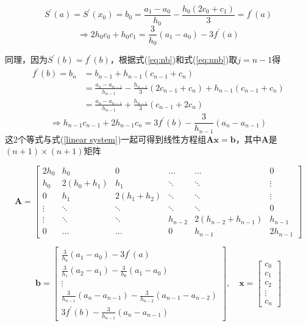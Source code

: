 \documentclass[12pt]{ctexart}
\begin{document}
	\begin{equation*}
	S^{'}(a)=S^{'}(x_0)=b_0=\frac{a_1-a_0}{h_0}-\frac{h_0(2c_0+c_1)}{3}=f^{'}(a)
	\end{equation*}
	\begin{equation*}
	\Rightarrow
	2h_0c_0+h_0c_1=\frac{3}{h_0}(a_1-a_0)-3f^{'}(a)
	\end{equation*}
	
	同理，因为$S^{'}(b)=f^{'}(b)$，根据式(\ref{eq:nb})和式(\ref{eq:nnb})取$j=n-1$得
	\begin{equation*}
	\begin{split}
	f^{'}(b)=b_n&=b_{n-1}+h_{n-1}(c_{n-1}+c_n) \\
	&=\frac{a_n-a_{n-1}}{h_{n-1}}-\frac{h_{n-1}}{3}(2c_{n-1}+c_n)+h_{n-1}(c_{n-1}+c_n) \\
	&=\frac{a_n-a_{n-1}}{h_{n-1}}+\frac{h_{n-1}}{3}(c_{n-1}+2c_n)
	\end{split}
	\end{equation*}
	\begin{equation*}
	\Rightarrow
	h_{n-1}c_{n-1}+2h_{n-1}c_n=3f^{'}(b)-\frac{3}{h_{n-1}}(a_n-a_{n-1})
	\end{equation*}
	这2个等式与式(\ref{linear system})一起可得到线性方程组$\mathbf{Ax}=\mathbf{b}$，其中$\mathbf{A}$是$(n+1)\times(n+1)$矩阵
	
	\[
	\mathbf{A}=\begin{bmatrix}
	2h_0&h_0&0&\dots&\dots&0 \\
	h_0&2(h_0+h_1)&h_1&\ddots&\ddots&\vdots \\
	0&h_1&2(h_1+h_2)&\ddots&\ddots&\vdots \\
	\vdots&\ddots&\ddots&\ddots&\ddots&0 \\
	\vdots&\ddots&\ddots&h_{n-2}&2(h_{n-2}+h_{n-1})&h_{n-1} \\
	0&\dots&\dots&0&h_{n-1}&2h_{n-1}
	\end{bmatrix}
	\]
	
	\[
	\mathbf{b}=\begin{bmatrix}
	\frac{3}{h_0}(a_1-a_0)-3f^{'}(a) \\
	\frac{3}{h_1}(a_2-a_1)-\frac{3}{h_0}(a_1-a_0) \\
	\vdots \\
	\frac{3}{h_{n-1}}(a_n-a_{n-1})-\frac{3}{h_{n-2}}(a_{n-1}-a_{n-2}) \\
	3f^{'}(b)-\frac{3}{h_{n-1}}(a_n-a_{n-1})
	\end{bmatrix},\quad
	\mathbf{x}=\begin{bmatrix}
	c_0 \\
	c_1 \\
	c_2 \\
	\vdots \\
	c_n
	\end{bmatrix}
	\]
	
\end{document}
